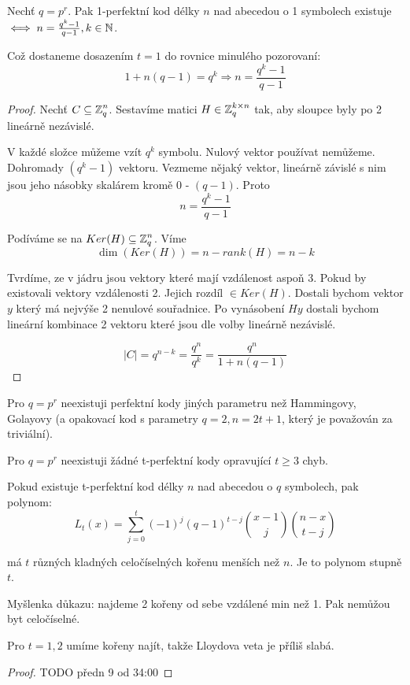 \begin{theorem}
	Nechť $q = p^r$. Pak 1-perfektní kod délky $n$ nad abecedou o 1 symbolech existuje $\iff n = \frac{q^k - 1}{q - 1}, k \in \operatorname{\mathbb{N}}$.

	Což dostaneme dosazením $t = 1$ do rovnice minulého pozorovaní:
	\[ 1 + n(q - 1) = q^k \Rightarrow n = \frac{q^k - 1}{q - 1} \]
\end{theorem}
\begin{proof}
	Nechť $C \subseteq \operatorname{\mathbb{Z}}_q^n$. Sestavíme matici $H \in \operatorname{\mathbb{Z}}_q^{k \times n}$ tak, aby sloupce byly po 2 lineárně nezávislé.

	V každé složce můžeme vzít $q^k$ symbolu. Nulový vektor používat nemůžeme. Dohromady $(q^k - 1)$ vektoru. Vezmeme nějaký vektor, lineárně závislé s nim jsou jeho násobky skalárem kromě 0 - $(q - 1)$. Proto
	\[ n = \frac{q^k - 1}{q - 1} \]

	Podíváme se na $Ker(H) \subseteq \operatorname{\mathbb{Z}}_q^n$. Víme
	\[ \dim(Ker(H)) = n - rank(H) = n - k \]

	Tvrdíme, ze v jádru jsou vektory které mají vzdálenost aspoň 3. Pokud by existovali vektory vzdálenosti 2. Jejich rozdíl $\in Ker(H)$.
	Dostali bychom vektor $y$ který má nejvýše 2 nenulové souřadnice. Po vynásobení $Hy$ dostali bychom lineární kombinace 2 vektoru které jsou dle volby lineárně nezávislé.

	\[ |C| = q^{n - k} = \frac{q^n}{q^k} = \frac{q^n}{1 + n(q-1)} \]
\end{proof}

\begin{theorem}
	Pro $q = p^r$ neexistuji perfektní kody jiných parametru než Hammingovy, Golayovy (a opakovací kod s parametry $q = 2, n = 2t + 1$, který je považován za triviální).
\end{theorem}

\begin{theorem}
	Pro $q = p^r$ neexistuji žádné t-perfektní kody opravující $t \geq 3$ chyb.
\end{theorem}

\begin{theorem}[Lloyd]
	Pokud existuje t-perfektní kod délky $n$ nad abecedou o $q$ symbolech, pak polynom:
	\[ L_t(x) = \sum_{j = 0}^t (-1)^j(q - 1)^{t - j} \binom{x - 1}{j} \binom{n - x}{t - j} \]

	má $t$ různých kladných celočíselných kořenu menších než $n$. Je to polynom stupně $t$.

	Myšlenka důkazu: najdeme 2 kořeny od sebe vzdálené min než 1. Pak nemůžou byt celočíselné.

	Pro $t = 1,2$ umíme kořeny najít, takže Lloydova veta je příliš slabá.
\end{theorem}
\begin{proof}
	TODO předn 9 od 34:00
\end{proof}

